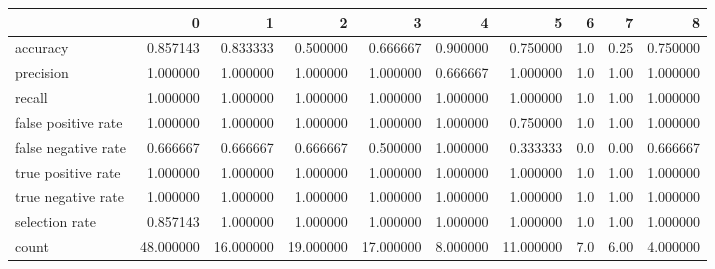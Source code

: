 \begin{tabular}{lrrrrrrrrr}
\toprule
{} &          0 &          1 &          2 &          3 &         4 &          5 &    6 &     7 &         8 \\
\midrule
accuracy            &   0.857143 &   0.833333 &   0.500000 &   0.666667 &  0.900000 &   0.750000 &  1.0 &  0.25 &  0.750000 \\
precision           &   1.000000 &   1.000000 &   1.000000 &   1.000000 &  0.666667 &   1.000000 &  1.0 &  1.00 &  1.000000 \\
recall              &   1.000000 &   1.000000 &   1.000000 &   1.000000 &  1.000000 &   1.000000 &  1.0 &  1.00 &  1.000000 \\
false positive rate &   1.000000 &   1.000000 &   1.000000 &   1.000000 &  1.000000 &   0.750000 &  1.0 &  1.00 &  1.000000 \\
false negative rate &   0.666667 &   0.666667 &   0.666667 &   0.500000 &  1.000000 &   0.333333 &  0.0 &  0.00 &  0.666667 \\
true positive rate  &   1.000000 &   1.000000 &   1.000000 &   1.000000 &  1.000000 &   1.000000 &  1.0 &  1.00 &  1.000000 \\
true negative rate  &   1.000000 &   1.000000 &   1.000000 &   1.000000 &  1.000000 &   1.000000 &  1.0 &  1.00 &  1.000000 \\
selection rate      &   0.857143 &   1.000000 &   1.000000 &   1.000000 &  1.000000 &   1.000000 &  1.0 &  1.00 &  1.000000 \\
count               &  48.000000 &  16.000000 &  19.000000 &  17.000000 &  8.000000 &  11.000000 &  7.0 &  6.00 &  4.000000 \\
\bottomrule
\end{tabular}

